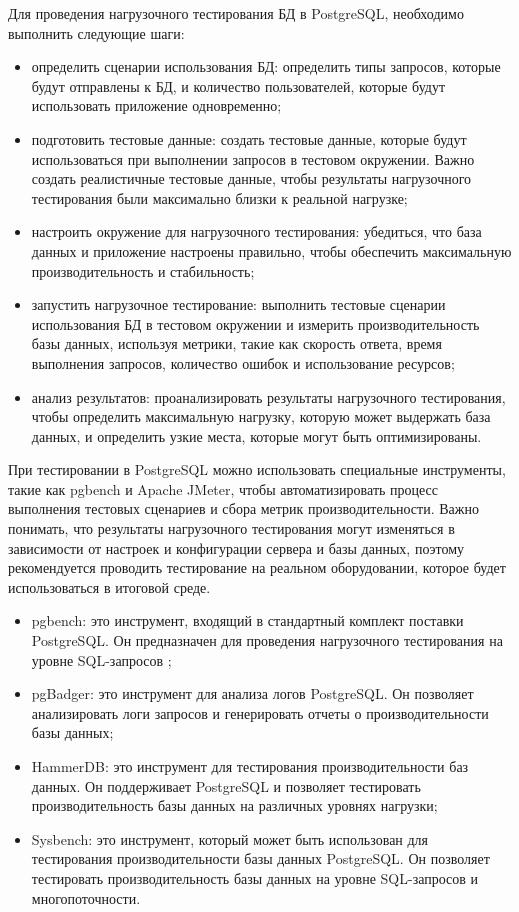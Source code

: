 Для проведения нагрузочного тестирования БД в PostgreSQL, необходимо выполнить следующие шаги:

\begin{itemize}
    \item определить сценарии использования БД: определить типы запросов, которые будут отправлены к БД, и количество пользователей, которые будут использовать приложение одновременно;
    \item подготовить тестовые данные: создать тестовые данные, которые будут использоваться при выполнении запросов в тестовом окружении. Важно создать реалистичные тестовые данные, чтобы результаты нагрузочного тестирования были максимально близки к реальной нагрузке;
    \item настроить окружение для нагрузочного тестирования: убедиться, что база данных и приложение настроены правильно, чтобы обеспечить максимальную производительность и стабильность;
    \item запустить нагрузочное тестирование: выполнить тестовые сценарии использования БД в тестовом окружении и измерить производительность базы данных, используя метрики, такие как скорость ответа, время выполнения запросов, количество ошибок и использование ресурсов;
    \item анализ результатов: проанализировать результаты нагрузочного тестирования, чтобы определить максимальную нагрузку, которую может выдержать база данных, и определить узкие места, которые могут быть оптимизированы.
\end{itemize}

При тестировании в PostgreSQL можно использовать специальные инструменты, такие как pgbench и Apache JMeter, чтобы автоматизировать процесс выполнения тестовых сценариев и сбора метрик производительности. Важно понимать, что результаты нагрузочного тестирования могут изменяться в зависимости от настроек и конфигурации сервера и базы данных, поэтому рекомендуется проводить тестирование на реальном оборудовании, которое будет использоваться в итоговой среде.

\begin{itemize}
    \item pgbench: это инструмент, входящий в стандартный комплект поставки PostgreSQL. Он предназначен для проведения нагрузочного тестирования на уровне SQL-запросов \cite{online10};
    \item pgBadger: это инструмент для анализа логов PostgreSQL. Он позволяет анализировать логи запросов и генерировать отчеты о производительности базы данных;
    \item HammerDB: это инструмент для тестирования производительности баз данных. Он поддерживает PostgreSQL и позволяет тестировать производительность базы данных на различных уровнях нагрузки;
    \item Sysbench: это инструмент, который может быть использован для тестирования производительности базы данных PostgreSQL. Он позволяет тестировать производительность базы данных на уровне SQL-запросов и многопоточности.
\end{itemize}

